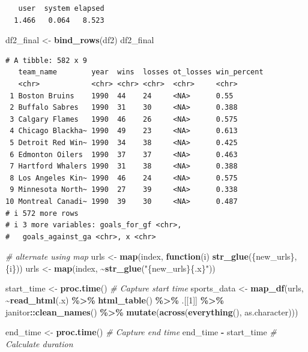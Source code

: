 \documentclass[
]{book}
\newenvironment{Shaded}{\begin{snugshade}}{\end{snugshade}}
\newcommand{\CommentTok}[1]{\textcolor[rgb]{0.56,0.35,0.01}{\textit{#1}}}
\newcommand{\ControlFlowTok}[1]{\textcolor[rgb]{0.13,0.29,0.53}{\textbf{#1}}}
\newcommand{\DecValTok}[1]{\textcolor[rgb]{0.00,0.00,0.81}{#1}}
\newcommand{\FunctionTok}[1]{\textcolor[rgb]{0.13,0.29,0.53}{\textbf{#1}}}
\newcommand{\NormalTok}[1]{#1}
\newcommand{\OtherTok}[1]{\textcolor[rgb]{0.56,0.35,0.01}{#1}}
\newcommand{\SpecialCharTok}[1]{\textcolor[rgb]{0.81,0.36,0.00}{\textbf{#1}}}
\newcommand{\StringTok}[1]{\textcolor[rgb]{0.31,0.60,0.02}{#1}}
\begin{document}
\begin{verbatim}
   user  system elapsed 
  1.466   0.064   8.523 
\end{verbatim}

\begin{Shaded}
\begin{Highlighting}[]
\NormalTok{df2\_final }\OtherTok{\textless{}{-}} \FunctionTok{bind\_rows}\NormalTok{(df2)}
\NormalTok{df2\_final}
\end{Highlighting}
\end{Shaded}

\begin{verbatim}
# A tibble: 582 x 9
   team_name        year  wins  losses ot_losses win_percent
   <chr>            <chr> <chr> <chr>  <chr>     <chr>      
 1 Boston Bruins    1990  44    24     <NA>      0.55       
 2 Buffalo Sabres   1990  31    30     <NA>      0.388      
 3 Calgary Flames   1990  46    26     <NA>      0.575      
 4 Chicago Blackha~ 1990  49    23     <NA>      0.613      
 5 Detroit Red Win~ 1990  34    38     <NA>      0.425      
 6 Edmonton Oilers  1990  37    37     <NA>      0.463      
 7 Hartford Whalers 1990  31    38     <NA>      0.388      
 8 Los Angeles Kin~ 1990  46    24     <NA>      0.575      
 9 Minnesota North~ 1990  27    39     <NA>      0.338      
10 Montreal Canadi~ 1990  39    30     <NA>      0.487      
# i 572 more rows
# i 3 more variables: goals_for_gf <chr>,
#   goals_against_ga <chr>, x <chr>
\end{verbatim}

\begin{Shaded}
\begin{Highlighting}[]
\CommentTok{\# alternate using map}
\NormalTok{urls }\OtherTok{\textless{}{-}} \FunctionTok{map}\NormalTok{(index, }\ControlFlowTok{function}\NormalTok{(i) }\FunctionTok{str\_glue}\NormalTok{(\{new\_urls\}, \{i\}))}
\NormalTok{urls }\OtherTok{\textless{}{-}} \FunctionTok{map}\NormalTok{(index, }\SpecialCharTok{\textasciitilde{}}\FunctionTok{str\_glue}\NormalTok{(}\StringTok{"\{new\_urls\}\{.x\}"}\NormalTok{))}

\NormalTok{start\_time }\OtherTok{\textless{}{-}} \FunctionTok{proc.time}\NormalTok{() }\CommentTok{\# Capture start time}
\NormalTok{sports\_data }\OtherTok{\textless{}{-}} \FunctionTok{map\_df}\NormalTok{(urls, }\SpecialCharTok{\textasciitilde{}}\FunctionTok{read\_html}\NormalTok{(.x) }\SpecialCharTok{\%\textgreater{}\%}
                  \FunctionTok{html\_table}\NormalTok{() }\SpecialCharTok{\%\textgreater{}\%}
\NormalTok{                  .[[}\DecValTok{1}\NormalTok{]] }\SpecialCharTok{\%\textgreater{}\%}
\NormalTok{                  janitor}\SpecialCharTok{::}\FunctionTok{clean\_names}\NormalTok{() }\SpecialCharTok{\%\textgreater{}\%}
                  \FunctionTok{mutate}\NormalTok{(}\FunctionTok{across}\NormalTok{(}\FunctionTok{everything}\NormalTok{(), as.character)))}

\NormalTok{end\_time }\OtherTok{\textless{}{-}} \FunctionTok{proc.time}\NormalTok{() }\CommentTok{\# Capture end time}
\NormalTok{end\_time }\SpecialCharTok{{-}}\NormalTok{ start\_time }\CommentTok{\# Calculate duration}
\end{Highlighting}
\end{Shaded}
\end{document}

